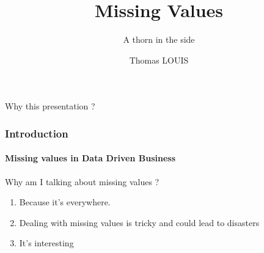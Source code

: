 \documentclass{beamer}
\title{Missing Values}
\subtitle{A thorn in the side}
\author{Thomas LOUIS}\institute{Data scientist}
\begin{document}
\begin{frame}
\titlepage
\end{frame}

\begin{frame}
	\begin{center}
	\Huge Why this presentation ?
	\end{center}
\end{frame}

\begin{frame}
\end{frame}

%
%

\begin{frame}
\frametitle{Introduction}
	\framesubtitle{Missing values in Data Driven Business}
	Why am I talking about missing values ?
        \begin{enumerate}
		\item<1- | alert@1> Because it's everywhere.
		\item<2- | alert@2> Dealing with missing values is tricky and could lead to disasters  
		\item<3- | alert@3> It's interesting
	\end{enumerate}
\end{frame}
\end{document}
